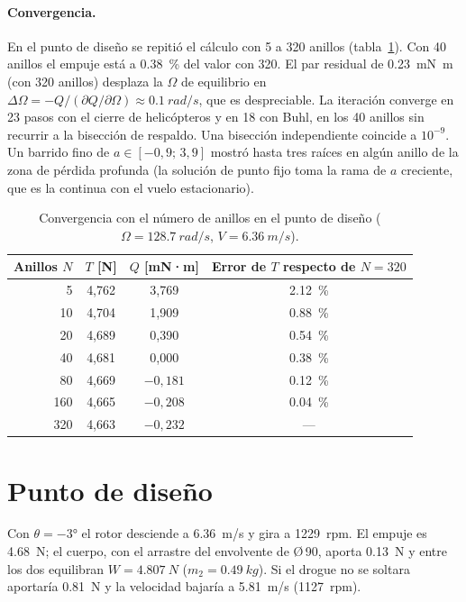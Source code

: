 \paragraph{Convergencia.} En el punto de diseño se repitió el cálculo con 5 a 320 anillos
(tabla~\ref{tab:bemt-malla}). Con 40 anillos el empuje está a \SI{0.38}{\percent} del
valor con 320. El par residual de \SI{0.23}{mN.m} (con 320 anillos) desplaza la $\Omega$ de
equilibrio en $\Delta\Omega=-Q/(\partial Q/\partial\Omega)\approx\SI{0.1}{rad/s}$, que es
despreciable. La iteración converge en 23 pasos con el cierre de helicópteros y en 18 con
Buhl, en los 40 anillos sin recurrir a la bisección de respaldo. Una bisección independiente
coincide a $10^{-9}$. Un barrido fino de $a\in[-0{,}9;\,3{,}9]$ mostró hasta tres raíces
en algún anillo de la zona de pérdida profunda (la solución de punto fijo toma la rama de
$a$ creciente, que es la continua con el vuelo estacionario).

\begin{table}[H]
\centering
\caption{Convergencia con el número de anillos en el punto de diseño
($\Omega=\SI{128.7}{rad/s}$, $V=\SI{6.36}{m/s}$).}
\label{tab:bemt-malla}
\begin{tabular}{rccc}
\toprule
Anillos $N$ & $T$ [N] & $Q$ [mN·m] & Error de $T$ respecto de $N=320$ \\
\midrule
5   & 4,762 & 3,769  & \SI{2.12}{\percent} \\
10  & 4,704 & 1,909  & \SI{0.88}{\percent} \\
20  & 4,689 & 0,390  & \SI{0.54}{\percent} \\
40  & 4,681 & 0,000  & \SI{0.38}{\percent} \\
80  & 4,669 & $-0{,}181$ & \SI{0.12}{\percent} \\
160 & 4,665 & $-0{,}208$ & \SI{0.04}{\percent} \\
320 & 4,663 & $-0{,}232$ & --- \\
\bottomrule
\end{tabular}
\end{table}

\section{Punto de diseño}\label{sec:bemt-base}

Con $\theta=\ang{-3}$ el rotor desciende a \SI{6.36}{m/s} y gira a \num{1229}~rpm. El
empuje es \SI{4.68}{N}; el cuerpo, con el arrastre del envolvente de Ø\,90, aporta \SI{0.13}{N} y entre los dos equilibran
$W=\SI{4.807}{N}$ ($m_2=\SI{0.49}{kg}$). Si el drogue no se soltara aportaría \SI{0.81}{N} y la
velocidad bajaría a \SI{5.81}{m/s} (\num{1127}~rpm).

